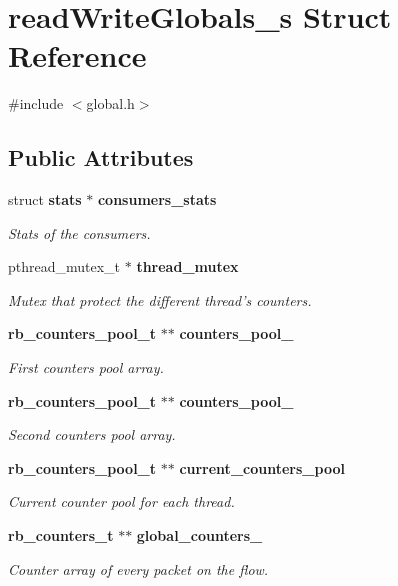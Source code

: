 \section{read\+Write\+Globals\+\_\+s Struct Reference}
\label{structread_write_globals__s}


{\ttfamily \#include $<$global.\+h$>$}

\subsection*{Public Attributes}
\begin{DoxyCompactItemize}
\item 
struct {\bf stats} $\ast$ {\bf consumers\+\_\+stats}
\begin{DoxyCompactList}\small\item\em Stats of the consumers. \end{DoxyCompactList}\item 
pthread\+\_\+mutex\+\_\+t $\ast$ {\bf thread\+\_\+mutex}
\begin{DoxyCompactList}\small\item\em Mutex that protect the different thread's counters. \end{DoxyCompactList}\item 
{\bf rb\+\_\+counters\+\_\+pool\+\_\+t} $\ast$$\ast$ {\bf counters\+\_\+pool\+\_}
\begin{DoxyCompactList}\small\item\em First counters pool array. \end{DoxyCompactList}\item 
{\bf rb\+\_\+counters\+\_\+pool\+\_\+t} $\ast$$\ast$ {\bf counters\+\_\+pool\+\_}
\begin{DoxyCompactList}\small\item\em Second counters pool array. \end{DoxyCompactList}\item 
{\bf rb\+\_\+counters\+\_\+pool\+\_\+t} $\ast$$\ast$ {\bf current\+\_\+counters\+\_\+pool}
\begin{DoxyCompactList}\small\item\em Current counter pool for each thread. \end{DoxyCompactList}\item 
{\bf rb\+\_\+counters\+\_\+t} $\ast$$\ast$ {\bf global\+\_\+counters\+\_}
\begin{DoxyCompactList}\small\item\em Counter array of every packet on the flow. \end{DoxyCompactList}\item 

\end{DoxyCompactItemize}
